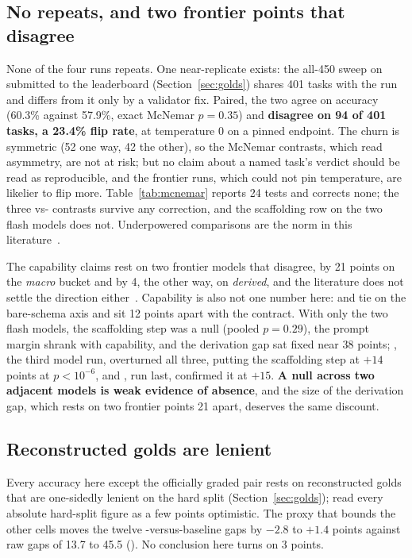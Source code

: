 \subsection{No repeats, and two frontier points that disagree}
\label{sec:power}

None of the four runs repeats. One near-replicate exists: the all-450
\armC{} sweep on \mGLM{} submitted to the leaderboard
(Section~\ref{sec:golds}) shares 401 tasks with the \mGLM{} run and differs
from it only by a validator fix. Paired, the two agree on accuracy (60.3\%
against 57.9\%, exact McNemar $p{=}0.35$) and \textbf{disagree on 94 of 401
tasks, a 23.4\% flip rate}, at temperature 0 on a pinned endpoint. The
churn is symmetric (52 one way, 42 the other), so the McNemar contrasts,
which read asymmetry, are not at risk; but no claim about a named task's
verdict should be read as reproducible, and the frontier runs, which could
not pin temperature, are likelier to flip more. Table~\ref{tab:mcnemar}
reports 24 tests and corrects none; the three vs-\armC{} contrasts survive
any correction, and the scaffolding row on the two flash models does not.
Underpowered comparisons are the norm in this
literature~\cite{little-power}.

The capability claims rest on two frontier models that disagree, by 21
points on the \emph{macro} bucket and by 4, the other way, on
\emph{derived}, and the literature does not settle the direction
either~\cite{prompt-engineering-advanced,scaffold-gaia}. Capability is also
not one number here: \mDS{} and \mSON{} tie on the bare-schema axis and sit
12 points apart with the contract. With only the two flash models, the
scaffolding step was a null (pooled $p{=}0.29$), the prompt margin shrank
with capability, and the derivation gap sat fixed near 38 points; \mGPT{},
the third model run, overturned all three, putting the scaffolding step at
$+14$ points at $p{<}10^{-6}$, and \mSON{}, run last, confirmed it at
$+15$. \textbf{A null across two adjacent models is weak evidence of
absence}, and the size of the derivation gap, which rests on two frontier
points 21 apart, deserves the same discount.

\subsection{Reconstructed golds are lenient}
\label{sec:threats-golds}

Every accuracy here except the officially graded pair rests on reconstructed
golds that are one-sidedly lenient on the hard split
(Section~\ref{sec:golds}); read every absolute hard-split figure as a few
points optimistic. The proxy that bounds the other cells moves the twelve
\armC{}-versus-baseline gaps by $-2.8$ to $+1.4$ points against raw gaps of
13.7 to 45.5 (). No conclusion here turns on 3 points.

